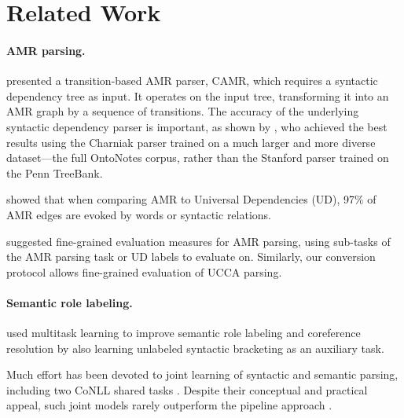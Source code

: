 \documentclass[11pt,a4paper]{article}
\begin{document}
\section{Related Work}\label{sec:related_work}

\paragraph{AMR parsing.}

presented a transition-based AMR parser, CAMR, which requires a
syntactic dependency tree as input.
It operates on the input tree, transforming it into an AMR graph
by a sequence of transitions.
The accuracy of the underlying syntactic dependency parser is important,
as shown by ,
who achieved the best results using the Charniak parser trained on a
much larger and more diverse dataset---the full OntoNotes corpus,
rather than the Stanford parser trained on the Penn TreeBank.

 showed that when comparing AMR to Universal Dependencies (UD),
97\% of AMR edges are evoked by words or syntactic relations.

 suggested fine-grained evaluation measures
for AMR parsing, using sub-tasks of the AMR parsing task or UD labels to evaluate on.
Similarly, our conversion protocol allows fine-grained evaluation of UCCA parsing.

\paragraph{Semantic role labeling.}

 used multitask learning to improve semantic role labeling and coreference resolution
by also learning unlabeled syntactic bracketing as an auxiliary task.

Much effort has been devoted to joint learning of syntactic
and semantic parsing, including
two CoNLL shared tasks \cite{surdeanu2008conll,hajivc2009conll}.
Despite their conceptual and practical appeal, such joint models rarely outperform
the pipeline approach %
\cite{lluis2008joint,henderson2013multilingual,D15-1169,swayamdipta-EtAl:2016:CoNLL,swayamdipta2017frame}.
\end{document}

